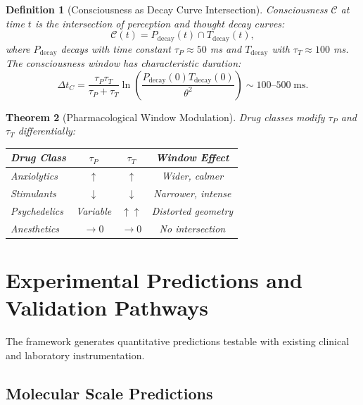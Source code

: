 \documentclass[twocolumn,10pt]{article}
\newtheorem{theorem}{Theorem}[section]
\newtheorem{definition}[theorem]{Definition}
\theoremstyle{remark}
\newcommand{\Ccat}{\mathcal{C}}
\newcommand{\Pdecay}{P_{\mathrm{decay}}}
\newcommand{\Tdecay}{T_{\mathrm{decay}}}
\begin{document}
\begin{definition}[Consciousness as Decay Curve Intersection]
\label{def:consciousness}
Consciousness $\Ccat$ at time $t$ is the intersection of perception and thought decay curves:
\begin{equation}
  \Ccat(t) = \Pdecay(t) \cap \Tdecay(t),
\end{equation}
where $\Pdecay$ decays with time constant $\tau_P \approx 50$ ms and $\Tdecay$ with $\tau_T \approx 100$ ms. The consciousness window has characteristic duration:
\begin{equation}
  \Delta t_C = \frac{\tau_P \tau_T}{\tau_P + \tau_T} \ln\left(\frac{\Pdecay(0) \Tdecay(0)}{\theta^2}\right) \sim 100\text{--}500\;\mathrm{ms}.
\end{equation}
\end{definition}

\begin{theorem}[Pharmacological Window Modulation]
\label{thm:window}
Drug classes modify $\tau_P$ and $\tau_T$ differentially:
\begin{center}
\begin{tabular}{lccc}
\toprule
Drug Class & $\tau_P$ & $\tau_T$ & Window Effect \\
\midrule
Anxiolytics & $\uparrow$ & $\uparrow$ & Wider, calmer \\
Stimulants & $\downarrow$ & $\downarrow$ & Narrower, intense \\
Psychedelics & Variable & $\uparrow\uparrow$ & Distorted geometry \\
Anesthetics & $\to 0$ & $\to 0$ & No intersection \\
\bottomrule
\end{tabular}
\end{center}
\end{theorem}

\section{Experimental Predictions and Validation Pathways}
\label{sec:predictions}

The framework generates quantitative predictions testable with existing clinical and laboratory instrumentation.

\subsection{Molecular Scale Predictions}
\end{document}
